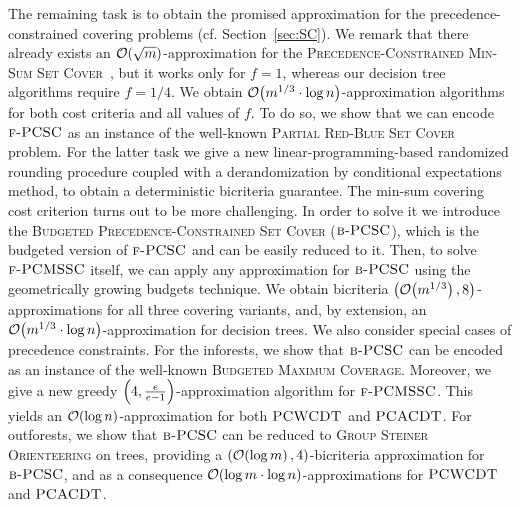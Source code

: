 The remaining task is to obtain the promised approximation for the precedence-constrained covering problems (cf. Section~\ref{sec:SC}).
We remark that there already exists an $\mathcal{O}(\sqrt{m})$-approximation for the \textup{\textsc{Precedence-Constrained Min-Sum Set Cover}}~\cite{PCMSSC}, but it works only for $f=1$, whereas our decision tree algorithms require $f=1/4$. We obtain $\mathcal{O}\mathopen{}\left( m^{1/3}\cdot\log n \right)$-approximation algorithms for both cost criteria and all values of $f$. To do so, we show that we can encode $\textup{\textsc{f-PCSC}}$ as an instance of the well-known \textup{\textsc{Partial Red-Blue Set Cover}} \cite{RedBlueSetCover} problem. For the latter task we give a new linear-programming-based randomized rounding procedure coupled with a derandomization by conditional expectations method, to obtain a deterministic bicriteria guarantee. 
The min-sum covering cost criterion turns out to be more challenging.
In order to solve it we introduce the \textup{\textsc{Budgeted Precedence-Constrained Set Cover}} ($\textup{\textsc{b-PCSC}}$), which is the budgeted version of $\textup{\textsc{f-PCSC}}$ and can be easily reduced to it. Then, to solve $\textup{\textsc{f-PCMSSC}}$ itself, we can apply any approximation for $\textup{\textsc{b-PCSC}}$ using the geometrically growing budgets technique. We obtain bicriteria $\mathopen{}\left( \mathcal{O}\mathopen{}\left( m^{1/3} \right),8 \right)$-approximations for all three covering variants, and, by extension, an $\mathcal{O}\mathopen{}\left( m^{1/3}\cdot\log n \right)$-approximation for decision trees. We also consider special cases of precedence constraints. For the inforests, we show that $\textup{\textsc{b-PCSC}}$ can be encoded as an instance of the well-known \textup{\textsc{Budgeted Maximum Coverage}}. Moreover, we give a new greedy $\mathopen{}\left( 4, \frac{e}{e-1} \right)$-approximation algorithm for $\textup{\textsc{f-PCMSSC}}$.
This yields an $\mathcal{O}(\log n)$-approximation for both $\textup{\textsc{PCWCDT}}$ and $\textup{\textsc{PCACDT}}$. For outforests, we show that $\textup{\textsc{b-PCSC}}$ can be reduced to \textup{\textsc{Group Steiner Orienteering}} on trees, providing a $\mathopen{}\left( \mathcal{O}\mathopen{}\left( \log m \right), 4 \right)$-bicriteria approximation for $\textup{\textsc{b-PCSC}}$, and as a consequence $\mathcal{O}\mathopen{}\left( \log m\cdot\log n \right)$-approximations for $\textup{\textsc{PCWCDT}}$ and $\textup{\textsc{PCACDT}}$.

\par\endgroup



